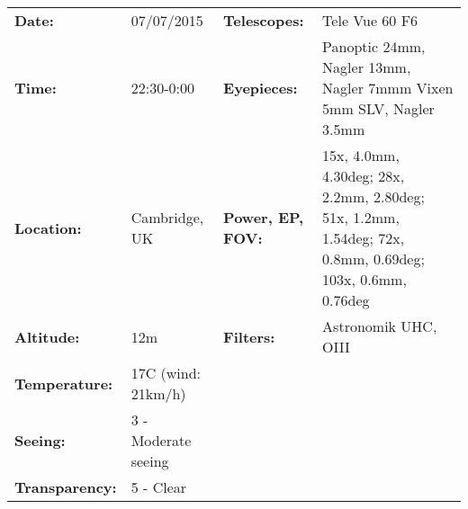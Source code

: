 \begin{tabular}{ p{0.9in} p{1.3in} p{1.2in} p{5.2in}}
{\bf Date:} & 07/07/2015 & {\bf Telescopes:} & Tele Vue 60 F6 \\ 
{\bf Time:} & 22:30-0:00 & {\bf Eyepieces:} & Panoptic 24mm, Nagler 13mm, Nagler 7mmm Vixen 5mm SLV, Nagler 3.5mm \\ 
{\bf Location:} & Cambridge, UK & {\bf Power, EP, FOV:} & 15x, 4.0mm, 4.30deg; 28x, 2.2mm, 2.80deg; 51x, 1.2mm, 1.54deg; 72x, 0.8mm, 0.69deg; 103x, 0.6mm, 0.76deg \\ 
{\bf Altitude:} & 12m & {\bf Filters:} & Astronomik UHC, OIII \\ 
{\bf Temperature:} & 17C (wind: 21km/h) & & \\ 
{\bf Seeing:} & 3 - Moderate seeing & & \\ 
{\bf Transparency:} & 5 - Clear & & \\ 
\end{tabular}

